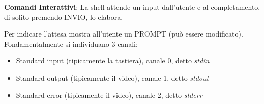 \begin{flushleft}
  \textbf{Comandi Interattivi}: La shell attende un input dall'utente e al completamento, di solito premendo INVIO, lo elabora. \par 
  Per indicare l’attesa mostra all’utente un PROMPT (può essere modificato). \\
  Fondamentalmente si individuano 3 canali:
  \begin{itemize}
    \item Standard input (tipicamente la tastiera), canale 0, detto \textit{stdin}
    \item Standard output (tipicamente il video), canale 1, detto \textit{stdout}
    \item Standard error (tipicamente il video), canale 2, detto \textit{stderr}
  \end{itemize}
\end{flushleft}
